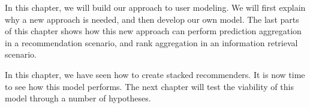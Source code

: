 \label{chap:methods}

In this chapter, we will build our approach to user modeling.
We will first explain why a new approach is needed,
and then develop our own model.
The last parts of this chapter shows how this new approach
can perform prediction aggregation in a recommendation scenario,
and rank aggregation in an information retrieval scenario.






\hr

In this chapter, we have seen how to create stacked recommenders.
It is now time to see how this model performs.
The next chapter will test the viability of this model
through a number of hypotheses.

